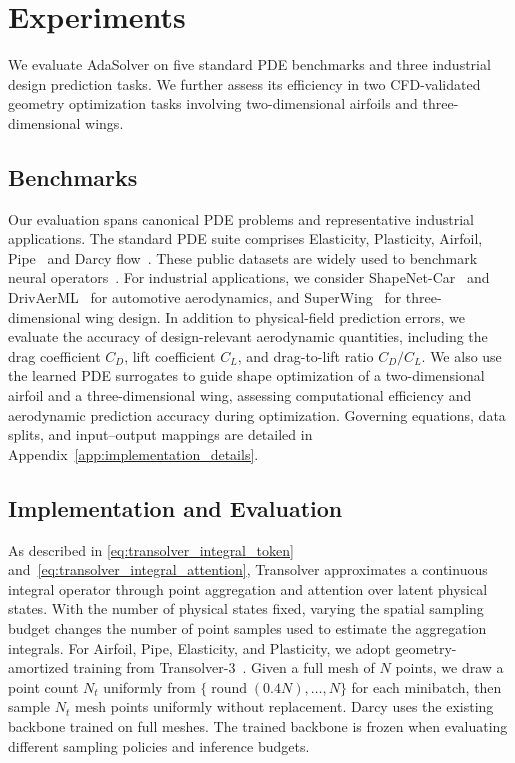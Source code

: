 \section{Experiments}
\label{sec:experiments}

We evaluate AdaSolver on five standard PDE benchmarks and three industrial design prediction tasks. We further assess its efficiency in two CFD-validated geometry optimization tasks involving two-dimensional airfoils and three-dimensional wings.

\subsection{Benchmarks}
\label{sec:experiment_benchmarks}

Our evaluation spans canonical PDE problems and representative industrial applications. The standard PDE suite comprises Elasticity, Plasticity, Airfoil, Pipe~\citep{li2023geofno} and Darcy flow~\citep{li2021fno}. These public datasets are widely used to benchmark neural operators~\citep{hao2023gnot,wu2024transolver}. 
For industrial applications, we consider ShapeNet-Car~\citep{umetani2018learning} and DrivAerML~\citep{ashton2024drivaerml} for automotive aerodynamics, and SuperWing~\citep{yang2025superwing} for three-dimensional wing design. In addition to physical-field prediction errors, we evaluate the accuracy of design-relevant aerodynamic quantities, including the drag coefficient $C_D$, lift coefficient $C_L$, and drag-to-lift ratio $C_D/C_L$. We also use the learned PDE surrogates to guide shape optimization of a two-dimensional airfoil and a three-dimensional wing, assessing computational efficiency and aerodynamic prediction accuracy during optimization. Governing equations, data splits, and input--output mappings are detailed in Appendix~\ref{app:implementation_details}.


\subsection{Implementation and Evaluation}
\label{sec:experiment_implementation}

As described in \eqref{eq:transolver_integral_token} and~\eqref{eq:transolver_integral_attention}, Transolver approximates a continuous integral operator through point aggregation and attention over latent physical states. With the number of physical states fixed, varying the spatial sampling budget changes the number of point samples used to estimate the aggregation integrals. For Airfoil, Pipe, Elasticity, and Plasticity, we adopt geometry-amortized training from Transolver-3~\citep{zhou2026transolver3}. Given a full mesh of $N$ points, we draw a point count $N_t$ uniformly from $\{\operatorname{round}(0.4N),\ldots,N\}$ for each minibatch, then sample $N_t$ mesh points uniformly without replacement. Darcy uses the existing backbone trained on full meshes. The trained backbone is frozen when evaluating different sampling policies and inference budgets.

